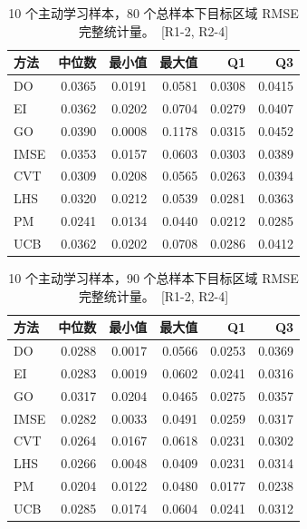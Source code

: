 \documentclass[]{interact}
\DeclareRobustCommand{\reviewadd}[2]{{\color{red}#1}\ {\color{blue}\footnotesize[#2]}}
\theoremstyle{plain}%
\theoremstyle{definition}
\theoremstyle{remark}
\begin{document}
\begin{table}[h!]
	\centering
	\caption{\reviewadd{10 个主动学习样本，80 个总样本下目标区域 RMSE 完整统计量。}{R1-2, R2-4}}
	\label{tab:app_a5}
	\begin{tabular}{l rrrrr}
		\toprule
		方法 & 中位数 & 最小值 & 最大值 & Q1 & Q3 \\
		\midrule
		DO   & 0.0365 & 0.0191 & 0.0581 & 0.0308 & 0.0415 \\
		EI   & 0.0362 & 0.0202 & 0.0704 & 0.0279 & 0.0407 \\
		GO   & 0.0390 & 0.0008 & 0.1178 & 0.0315 & 0.0452 \\
		IMSE & 0.0353 & 0.0157 & 0.0603 & 0.0303 & 0.0389 \\
		CVT  & 0.0309 & 0.0208 & 0.0565 & 0.0263 & 0.0394 \\
		LHS  & 0.0320 & 0.0212 & 0.0539 & 0.0281 & 0.0363 \\
		PM   & 0.0241 & 0.0134 & 0.0440 & 0.0212 & 0.0285 \\
		UCB  & 0.0362 & 0.0202 & 0.0708 & 0.0286 & 0.0412 \\
		\bottomrule
	\end{tabular}
\end{table}

\begin{table}[h!]
	\centering
	\caption{\reviewadd{10 个主动学习样本，90 个总样本下目标区域 RMSE 完整统计量。}{R1-2, R2-4}}
	\label{tab:app_a6}
	\begin{tabular}{l rrrrr}
		\toprule
		方法 & 中位数 & 最小值 & 最大值 & Q1 & Q3 \\
		\midrule
		DO   & 0.0288 & 0.0017 & 0.0566 & 0.0253 & 0.0369 \\
		EI   & 0.0283 & 0.0019 & 0.0602 & 0.0241 & 0.0316 \\
		GO   & 0.0317 & 0.0204 & 0.0465 & 0.0275 & 0.0357 \\
		IMSE & 0.0282 & 0.0033 & 0.0491 & 0.0259 & 0.0317 \\
		CVT  & 0.0264 & 0.0167 & 0.0618 & 0.0231 & 0.0302 \\
		LHS  & 0.0266 & 0.0048 & 0.0409 & 0.0231 & 0.0314 \\
		PM   & 0.0204 & 0.0122 & 0.0480 & 0.0177 & 0.0238 \\
		UCB  & 0.0285 & 0.0174 & 0.0604 & 0.0241 & 0.0312 \\
		\bottomrule
	\end{tabular}
\end{table}
\end{document}
